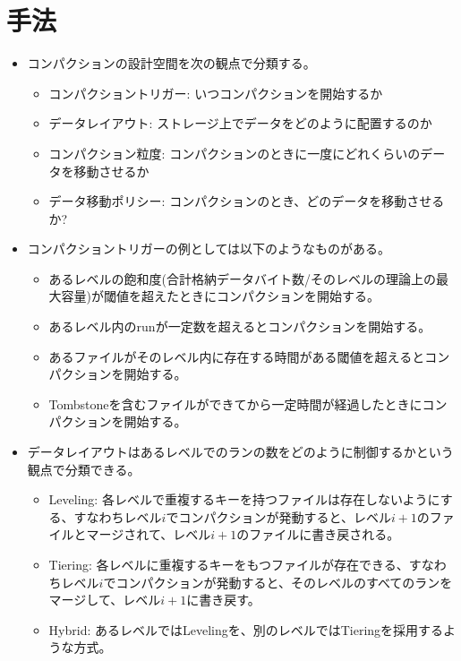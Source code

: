 \documentclass[dvipdfmx,uplatex]{jsarticle}
\theoremstyle{remark}
\newenvironment{method}[1]{
    \begin{tcolorbox}[
        colframe=green!50!black,
        colback=green!50!black!10!white,
        colbacktitle=green!50!black!40!white,
        coltitle=black,
        fonttitle=\bfseries,
        title={#1}
    ]
}{
    \end{tcolorbox}
}
\begin{document}
\section{手法}
\begin{method}{コンパクションの設計空間}
\begin{itemize}
    \item コンパクションの設計空間を次の観点で分類する。
    \begin{itemize}
        \item コンパクショントリガー: いつコンパクションを開始するか
        \item データレイアウト: ストレージ上でデータをどのように配置するのか
        \item コンパクション粒度: コンパクションのときに一度にどれくらいのデータを移動させるか
        \item データ移動ポリシー: コンパクションのとき、どのデータを移動させるか?
    \end{itemize}
    \item コンパクショントリガーの例としては以下のようなものがある。
    \begin{itemize}
        \item あるレベルの飽和度(合計格納データバイト数/そのレベルの理論上の最大容量)が閾値を超えたときにコンパクションを開始する。
        \item あるレベル内のrunが一定数を超えるとコンパクションを開始する。
        \item あるファイルがそのレベル内に存在する時間がある閾値を超えるとコンパクションを開始する。
        \item Tombstoneを含むファイルができてから一定時間が経過したときにコンパクションを開始する。
    \end{itemize}
    \item データレイアウトはあるレベルでのランの数をどのように制御するかという観点で分類できる。
    \begin{itemize}
        \item Leveling: 各レベルで重複するキーを持つファイルは存在しないようにする、すなわちレベル$i$でコンパクションが発動すると、レベル$i+1$のファイルとマージされて、レベル$i+1$のファイルに書き戻される。
        \item Tiering: 各レベルに重複するキーをもつファイルが存在できる、すなわちレベル$i$でコンパクションが発動すると、そのレベルのすべてのランをマージして、レベル$i+1$に書き戻す。
        \item Hybrid: あるレベルではLevelingを、別のレベルではTieringを採用するような方式。

\end{itemize}
\end{itemize}
\end{method}
\end{document}

